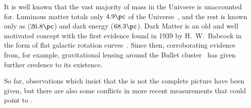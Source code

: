 It is well known that the vast majority of mass in the Univsere is unaccounted for.
Luminous matter totals only \approx$4.9\pc$ of the Universe~\cite{Adam:2015rua,PDG2014}, and the rest
is known only as \dm (\approx$26.8\pc$) and dark energy (\approx$68.3\pc$).
Dark Matter is an old and well motivated concept with the first evidence found in 1939 by H.~W.~Babcock
in the form of flat galactic rotation curves~\cite{1970ApJ...159..379R,1980ApJ...238..471R}.
Since then, corroborating evidence from, for example, gravitational lensing around the Bullet
cluster~\cite{Markevitch:2003at} has given further credence to its existence.





So far, observations which insist that the \sm is not the complete picture have been given, but
there are also some conflicts in more recent measurements that could point to \np.

